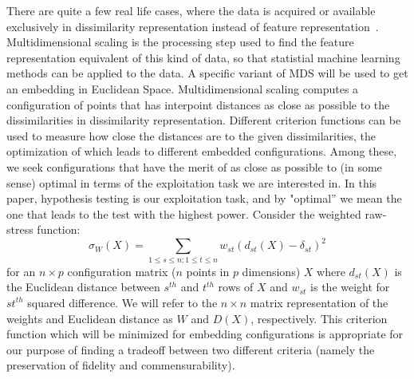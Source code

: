 \documentclass[11pt]{article} %
\begin{document}
There are quite  a few real life cases, where the data is acquired or available exclusively in dissimilarity representation instead of feature representation~\cite{CMDS,borg+groenen:1997,duin2005dissimilarity}.
 Multidimensional scaling is the processing step used to find the feature representation equivalent of this kind of data, so that  statistial machine learning methods can be applied to the data. A specific variant of MDS will be used to get an embedding in  Euclidean Space. Multidimensional scaling computes a configuration of points that has interpoint distances as close as possible to the dissimilarities in dissimilarity representation. Different criterion functions can be used to measure how close the distances are  to the given dissimilarities, the optimization of which leads to different embedded configurations. Among these, we seek configurations that have  the merit of  as close as possible to (in some sense) optimal in terms of the exploitation task we are interested in. In this paper, hypothesis testing is our exploitation task, and  by "optimal'' we mean the one that leads to the  test with  the highest power. Consider the weighted raw-stress function:
\begin{equation}
\sigma_{W}(X)=\sum_{1\leq s\leq n;1\leq t\leq n} {w_{st}(d_{st}(X)-\delta_{st})^2  }\label{raw-stress}
\end{equation}
 for an  $n \times p$ configuration matrix ($n$ points in $p$ dimensions)  $X$  where $d_{st}(X)$ is the Euclidean distance between $s^{th}$ and $t^{th}$ rows of $X$ and $w_{st}$ is the weight for $st^{th}$  squared difference.  We will refer to the $n \times n$  matrix representation of the weights and Euclidean distance as $W$ and $D(X)$, respectively. This   criterion function which will be minimized for embedding configurations is appropriate for our purpose of finding a tradeoff between two different criteria (namely the preservation of fidelity and commensurability).
\end{document}
